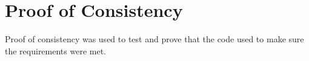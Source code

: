 \section{Proof of Consistency}
Proof of consistency was used to test and prove that the code used to make sure the requirements were met.

